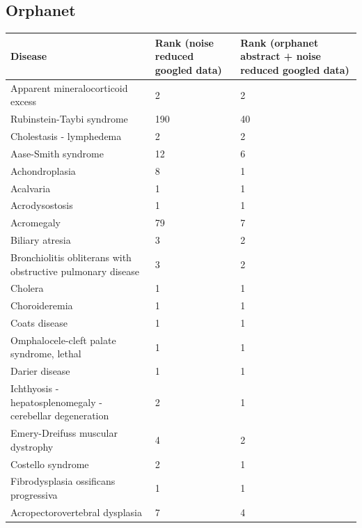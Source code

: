 \documentclass[10pt,letterpaper,final]{article}
\begin{document}
\subsection{Orphanet}
\label{app:orphanet_with_without}
\begin{center}
\begin{small}
	\begin{longtable}{|p{6cm}|p{2.5cm}|p{2.5cm}|}
	\hline
	\textbf{Disease}  & \textbf{Rank (noise reduced googled data)} & \textbf{Rank (orphanet abstract + noise reduced googled data)} \\
	\hline\hline
Apparent mineralocorticoid excess       &  2 & 2 \\ \hline
Rubinstein-Taybi syndrome               &  190 & 40 \\ \hline
Cholestasis - lymphedema                &  2 & 2 \\ \hline
Aase-Smith syndrome                     &  12 & 6 \\ \hline
Achondroplasia                          &  8 & 1 \\ \hline
Acalvaria                               &  1 & 1 \\ \hline
Acrodysostosis                          &  1 & 1 \\ \hline
Acromegaly                              &  79 & 7 \\ \hline
Biliary atresia                         &   3 & 2 \\ \hline
Bronchiolitis obliterans with obstructive pulmonary disease & 3  & 2 \\ \hline
Cholera                                 &  1 & 1 \\ \hline
Choroideremia                           &  1 & 1 \\ \hline
Coats disease                           &  1 & 1 \\ \hline
Omphalocele-cleft palate syndrome, lethal   &  1 & 1 \\ \hline
Darier disease                          &  1 & 1 \\ \hline
Ichthyosis - hepatosplenomegaly - cerebellar degeneration   & 2 & 1 \\ \hline
Emery-Dreifuss muscular dystrophy       &  4 & 2 \\ \hline
Costello syndrome                       &  2 & 1 \\ \hline
Fibrodysplasia ossificans progressiva   &  1 & 1 \\ \hline
Acropectorovertebral dysplasia          &  7 & 4 \\ \hline

\end{longtable}
\end{small}
\end{center}
\end{document}
